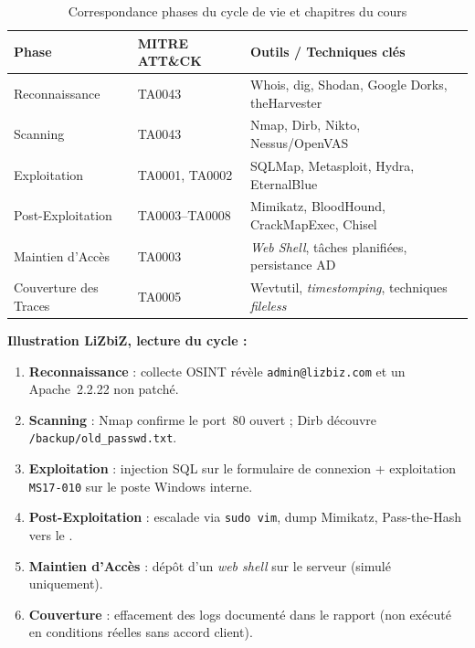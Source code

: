 \begin{table}[htbp]
\centering
\caption{Correspondance phases du cycle de vie et chapitres du cours}
\label{tab:cycle_chapitres}
\begin{tabular}{p{3.2cm}p{3cm}p{6.5cm}}
\toprule
\textbf{Phase} & \textbf{MITRE ATT\&CK} & \textbf{Outils / Techniques clés} \\
\midrule
Reconnaissance
    & TA0043
    & Whois, dig, Shodan, Google Dorks, theHarvester \\
\addlinespace
Scanning
    & TA0043
    & Nmap, Dirb, Nikto, Nessus/OpenVAS \\
\addlinespace
Exploitation
    & TA0001, TA0002
    & SQLMap, Metasploit, Hydra, EternalBlue \\
\addlinespace
Post-Exploitation
    & TA0003--TA0008
    & Mimikatz, BloodHound, CrackMapExec, Chisel \\
\addlinespace
Maintien d'Accès
    & TA0003
    & \textit{Web Shell}, tâches planifiées, persistance AD \\
\addlinespace
Couverture des Traces
    & TA0005
    & Wevtutil, \textit{timestomping}, techniques \textit{fileless} \\
\bottomrule
\end{tabular}
\end{table}

\begin{boxlizbiz}
\textbf{Illustration LiZbiZ, lecture du cycle :}
\begin{enumerate}
    \item \textbf{Reconnaissance} : collecte OSINT révèle
          \texttt{admin@lizbiz.com} et un Apache~2.2.22 non patché.
    \item \textbf{Scanning} : Nmap confirme le port~80 ouvert ; Dirb découvre
          \texttt{/backup/old\_passwd.txt}.
    \item \textbf{Exploitation} : injection SQL sur le formulaire de connexion
          + exploitation \texttt{MS17-010} sur le poste Windows interne.
    \item \textbf{Post-Exploitation} : escalade via \texttt{sudo vim},
          dump Mimikatz, Pass-the-Hash vers le .
    \item \textbf{Maintien d'Accès} : dépôt d'un \textit{web shell} 
          sur le serveur  (simulé uniquement).
    \item \textbf{Couverture} : effacement des logs documenté dans le rapport
          (non exécuté en conditions réelles sans accord client).
\end{enumerate}
\end{boxlizbiz}

